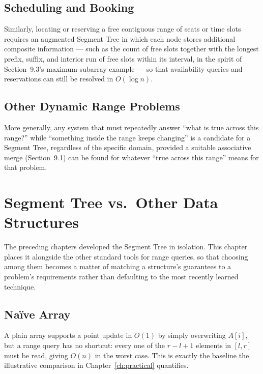 \documentclass[
  11pt,
  a4paper,
  twoside=false,
  numbers=noenddot,
  headings=big,
  parskip=half,
  toc=bibliography,
  toc=listof,
  bibliography=totoc
]{scrreprt}
\newcounter{example}[chapter]
\newcommand{\Oh}[1]{O\!\left(#1\right)}
\begin{document}
\section{Scheduling and Booking}
Similarly, locating or reserving a free contiguous range of seats or time slots requires an augmented Segment Tree in which each node stores additional composite information --- such as the count of free slots together with the longest prefix, suffix, and interior run of free slots within its interval, in the spirit of Section~9.3's maximum-subarray example --- so that availability queries and reservations can still be resolved in $\Oh{\log n}$.

\section{Other Dynamic Range Problems}
More generally, any system that must repeatedly answer ``what is true across this range?'' while ``something inside the range keeps changing'' is a candidate for a Segment Tree, regardless of the specific domain, provided a suitable associative merge (Section~9.1) can be found for whatever ``true across this range'' means for that problem.




\chapter{Segment Tree vs.\ Other Data Structures}
\label{ch:comparison}

The preceding chapters developed the Segment Tree in isolation. This chapter places it alongside the other standard tools for range queries, so that choosing among them becomes a matter of matching a structure's guarantees to a problem's requirements rather than defaulting to the most recently learned technique.

\section{Na\"ive Array}
A plain array supports a point update in $\Oh{1}$ by simply overwriting $A[i]$, but a range query has no shortcut: every one of the $r-l+1$ elements in $[l,r]$ must be read, giving $\Oh{n}$ in the worst case. This is exactly the baseline the illustrative comparison in Chapter~\ref{ch:practical} quantifies.
\end{document}
